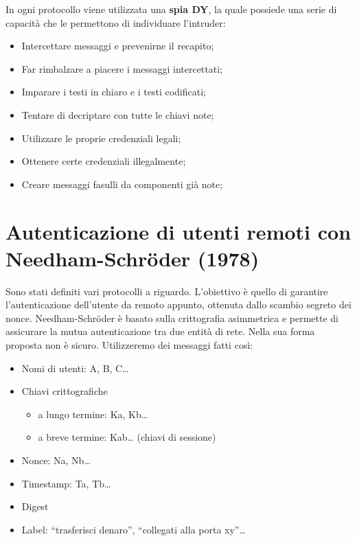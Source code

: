 In ogni protocollo viene utilizzata una \textbf{spia DY}, la quale possiede una serie di capacità che le
permettono di individuare l’intruder:
\begin{itemize}
    \item Intercettare messaggi e prevenirne il recapito;
    \item Far rimbalzare a piacere i messaggi intercettati;
    \item Imparare i testi in chiaro e i testi codificati;
    \item Tentare di decriptare con tutte le chiavi note;
    \item Utilizzare le proprie credenziali legali;
    \item Ottenere certe credenziali illegalmente;
    \item Creare messaggi fasulli da componenti già note;
\end{itemize}

\section{Autenticazione di utenti remoti con Needham-Schr\"{o}der (1978)}

Sono stati definiti vari protocolli a riguardo. L’obiettivo è quello di
garantire l’autenticazione
dell’utente da remoto appunto, ottenuta dallo scambio segreto dei nonce.
Needham-Schröder è basato sulla crittografia asimmetrica e permette
di assicurare la mutua
autenticazione tra due entità di rete. Nella sua forma proposta
non è sicuro.
Utilizzeremo dei messaggi fatti così:

\begin{itemize}
    \item Nomi di utenti: A, B, C…
    \item Chiavi crittografiche
          \begin{itemize}
              \item a lungo termine: Ka, Kb…
              \item a breve termine: Kab… (chiavi di sessione)
          \end{itemize}
    \item Nonce: Na, Nb…
    \item Timestamp: Ta, Tb…
    \item Digest
    \item Label: “trasferisci denaro”, “collegati alla porta xy”…
\end{itemize}

